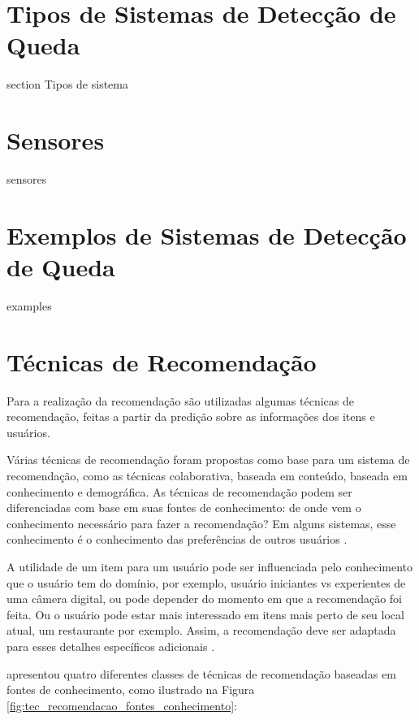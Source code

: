 \section{Tipos de Sistemas de Detecção de Queda}
\label{sec:fall_system_types}
section Tipos de sistema
\section{Sensores}
\label{sec:sensors}
sensores

\section{Exemplos de Sistemas de Detecção de Queda}
\label{sec:fds_examples}
examples


\section{Técnicas de Recomendação}
\label{sec:tecnicnasRecomendacao}

Para a realização da recomendação são utilizadas algumas técnicas de recomendação, feitas a partir da predição sobre as informações dos itens e usuários.

Várias técnicas de recomendação foram propostas como base para um sistema de recomendação, como as técnicas colaborativa, baseada em conteúdo, baseada em conhecimento e demográfica. As técnicas de recomendação podem ser diferenciadas com base em suas fontes de conhecimento: de onde vem o conhecimento necessário para fazer a recomendação? Em alguns sistemas, esse conhecimento é o conhecimento das preferências de outros usuários \citep{Burke:2007:HWR:1768197.1768211}.

A utilidade de um item para um usuário pode ser influenciada pelo conhecimento que o usuário tem do domínio, por exemplo, usuário iniciantes vs experientes de uma câmera digital, ou pode depender do momento em que a recomendação foi feita. Ou o usuário pode estar mais interessado em itens mais perto de seu local atual, um restaurante por exemplo. Assim, a recomendação deve ser adaptada para esses detalhes específicos adicionais \citep{ricci2011recommender}.

\cite{Burke:2007:HWR:1768197.1768211} apresentou quatro diferentes classes de técnicas de recomendação baseadas em fontes de conhecimento, como ilustrado na Figura \ref{fig:tec_recomendacao_fontes_conhecimento}:

